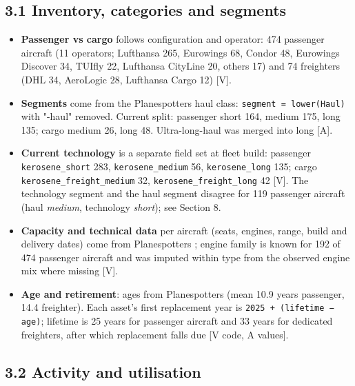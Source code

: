 \documentclass[11pt,a4paper]{article}
\begin{document}
\subsection*{3.1 Inventory, categories and segments}

\begin{itemize}
\item{} \textbf{Passenger vs cargo} follows configuration and operator: 474 passenger aircraft (11 operators; Lufthansa 265, Eurowings 68, Condor 48, Eurowings Discover 34, TUIfly 22, Lufthansa CityLine 20, others 17) and 74 freighters (DHL 34, AeroLogic 28, Lufthansa Cargo 12) [V].
\item{} \textbf{Segments} come from the Planespotters haul class: \texttt{segment = lower(Haul)} with "-haul" removed. Current split: passenger short 164, medium 175, long 135; cargo medium 26, long 48. Ultra-long-haul was merged into long [A].
\item{} \textbf{Current technology} is a separate field set at fleet build: passenger \texttt{kerosene\_\allowbreak{}short} 283, \texttt{kerosene\_\allowbreak{}medium} 56, \texttt{kerosene\_\allowbreak{}long} 135; cargo \texttt{kerosene\_\allowbreak{}freight\_\allowbreak{}medium} 32, \texttt{kerosene\_\allowbreak{}freight\_\allowbreak{}long} 42 [V]. The technology segment and the haul segment disagree for 119 passenger aircraft (haul \emph{medium}, technology \emph{short}); see Section 8.
\item{} \textbf{Capacity and technical data} per aircraft (seats, engines, range, build and delivery dates) come from Planespotters \citep{planespotters2023}; engine family is known for 192 of 474 passenger aircraft and was imputed within type from the observed engine mix where missing [V].
\item{} \textbf{Age and retirement}: ages from Planespotters (mean 10.9 years passenger, 14.4 freighter). Each asset's first replacement year is \texttt{2025 + (lifetime − age)}; lifetime is 25 years for passenger aircraft and 33 years for dedicated freighters, after which replacement falls due [V code, A values].
\end{itemize}

\subsection*{3.2 Activity and utilisation}
\end{document}
